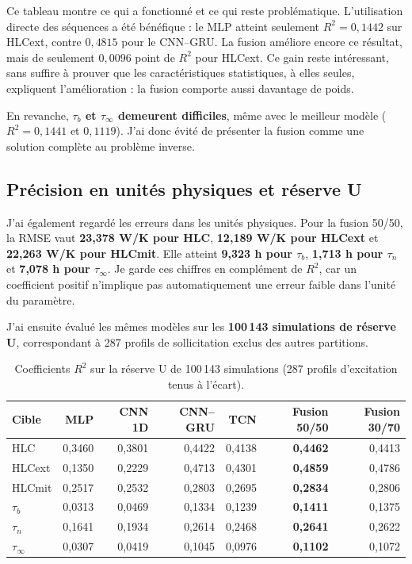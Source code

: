 \documentclass[10pt,a4paper]{article}
\begin{document}
Ce tableau montre ce qui a fonctionné et ce qui reste problématique. L'utilisation directe des séquences a été bénéfique : le MLP atteint seulement $R^2=0{,}1442$ sur HLCext, contre $0{,}4815$ pour le CNN--GRU. La fusion améliore encore ce résultat, mais de seulement $0{,}0096$ point de $R^2$ pour HLCext. Ce gain reste intéressant, sans suffire à prouver que les caractéristiques statistiques, à elles seules, expliquent l'amélioration : la fusion comporte aussi davantage de poids.

En revanche, \textbf{$\tau_b$ et $\tau_\infty$ demeurent difficiles}, même avec le meilleur modèle ($R^2=0{,}1441$ et $0{,}1119$). J'ai donc évité de présenter la fusion comme une solution complète au problème inverse.

\subsection{Précision en unités physiques et réserve U}
J'ai également regardé les erreurs dans les unités physiques. Pour la fusion 50/50, la RMSE vaut \textbf{23,378 W/K pour HLC}, \textbf{12,189 W/K pour HLCext} et \textbf{22,263 W/K pour HLCmit}. Elle atteint \textbf{9,323 h pour $\tau_b$}, \textbf{1,713 h pour $\tau_n$} et \textbf{7,078 h pour $\tau_\infty$}. Je garde ces chiffres en complément de $R^2$, car un coefficient positif n'implique pas automatiquement une erreur faible dans l'unité du paramètre.

J'ai ensuite évalué les mêmes modèles sur les \textbf{100\,143 simulations de réserve U}, correspondant à 287 profils de sollicitation exclus des autres partitions.

\begin{table}[htbp]
\centering
\caption{Coefficients $R^2$ sur la réserve U de 100\,143 simulations (287 profils d'excitation tenus à l'écart).}
\label{tab:reserve}
\footnotesize
\setlength{\tabcolsep}{4.4pt}
\begin{tabular}{lrrrrrr}
\toprule
Cible & MLP & CNN 1D & CNN--GRU & TCN & Fusion 50/50 & Fusion 30/70 \\
\midrule
HLC & 0,3460 & 0,3801 & 0,4422 & 0,4138 & \textbf{0,4462} & 0,4413 \\
HLCext & 0,1350 & 0,2229 & 0,4713 & 0,4301 & \textbf{0,4859} & 0,4786 \\
HLCmit & 0,2517 & 0,2532 & 0,2803 & 0,2695 & \textbf{0,2834} & 0,2806 \\
$\tau_b$ & 0,0313 & 0,0469 & 0,1334 & 0,1239 & \textbf{0,1411} & 0,1375 \\
$\tau_n$ & 0,1641 & 0,1934 & 0,2614 & 0,2468 & \textbf{0,2641} & 0,2622 \\
$\tau_\infty$ & 0,0307 & 0,0419 & 0,1045 & 0,0976 & \textbf{0,1102} & 0,1072 \\
\bottomrule
\end{tabular}
\end{table}
\end{document}
